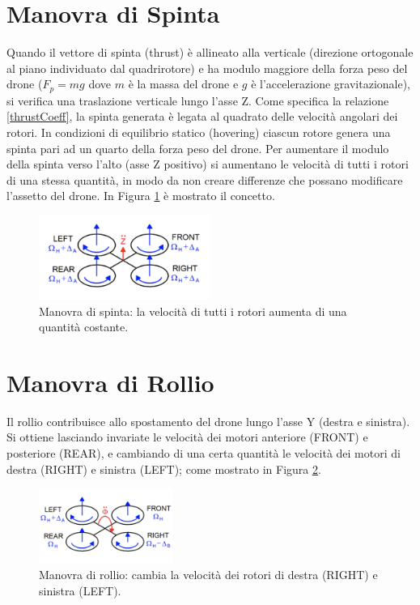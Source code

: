 \section*{Manovra di Spinta}
Quando il vettore di spinta (thrust) è allineato alla verticale (direzione ortogonale al piano individuato dal quadrirotore) e ha modulo maggiore della forza peso del drone ($F_p = mg$ dove $m$ è la massa del drone e $g$ è l'accelerazione gravitazionale), si verifica una traslazione verticale lungo l'asse Z. Come specifica la relazione \ref{thrustCoeff}, la spinta generata è legata al quadrato delle velocità angolari dei rotori. In condizioni di equilibrio statico (hovering) ciascun rotore genera una spinta pari ad un quarto della forza peso del drone. Per aumentare il modulo della spinta verso l'alto (asse Z positivo) si aumentano le velocità di tutti i rotori di una stessa quantità, in modo da non creare differenze che possano modificare l'assetto del drone. In Figura \ref{fig:thrust_quad} è mostrato il concetto.

\begin{figure}[H]
    \centering
    \includegraphics[width=0.5\textwidth]{gfx/thrust_quad}
    \caption[Manovra di spinta di un quadrirotore.]{Manovra di spinta: la velocità di tutti i rotori aumenta di una quantità costante.}
    \label{fig:thrust_quad}
\end{figure}

\pagebreak

\section*{Manovra di Rollio}
Il rollio contribuisce allo spostamento del drone lungo l'asse Y (destra e sinistra). Si ottiene lasciando invariate le velocità dei motori anteriore (FRONT) e posteriore (REAR), e cambiando di una certa quantità le velocità dei motori di destra (RIGHT) e sinistra (LEFT); come mostrato in Figura \ref{fig:roll_quad}.

\begin{figure}[H]
    \centering
    \includegraphics[width=0.39\textwidth]{gfx/roll_quad}
    \caption[Manovra di rollio di un quadrirotore.]{Manovra di rollio: cambia la velocità dei rotori di destra (RIGHT) e sinistra (LEFT).}
    \label{fig:roll_quad}
\end{figure}

